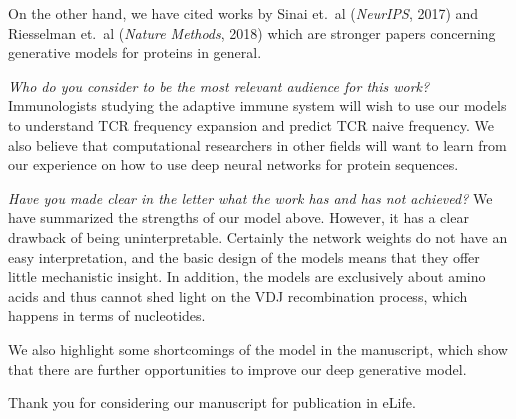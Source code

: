 \documentclass[letterpaper,10pt]{article}
\begin{document}
On the other hand, we have cited works by Sinai et.\ al (\emph{NeurIPS}, 2017) and Riesselman et.\ al (\emph{Nature Methods}, 2018) which are stronger papers concerning generative models for proteins in general.


\vspace{4pt} \textit{Who do you consider to be the most relevant audience for this work?}
Immunologists studying the adaptive immune system will wish to use our models to understand TCR frequency expansion and predict TCR naive frequency.
We also believe that computational researchers in other fields will want to learn from our experience on how to use deep neural networks for protein sequences.

\vspace{4pt} \textit{Have you made clear in the letter what the work has and has not achieved?}
We have summarized the strengths of our model above.
However, it has a clear drawback of being uninterpretable.
Certainly the network weights do not have an easy interpretation, and the basic design of the models means that they offer little mechanistic insight.
In addition, the models are exclusively about amino acids and thus cannot shed light on the VDJ recombination process, which happens in terms of nucleotides.

We also highlight some shortcomings of the model in the manuscript, which show that there are further opportunities to improve our deep generative model.

\vspace{4pt}
Thank you for considering our manuscript for publication in eLife.
\end{document}
